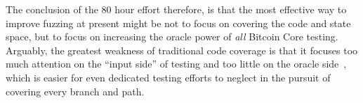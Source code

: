 The conclusion of the 80 hour effort therefore, is that the most
effective way to improve fuzzing at present might be not to focus on
covering the code and state space, but to focus on increasing the
oracle power of \emph{all} Bitcoin Core testing.  Arguably, the
greatest weakness of traditional code coverage is that it focuses too
much attention on the ``input side'' of testing and too little on the
oracle side~\cite{barr2014oracle}, which is easier for even dedicated
testing efforts to neglect in the pursuit of covering every branch and
path.
